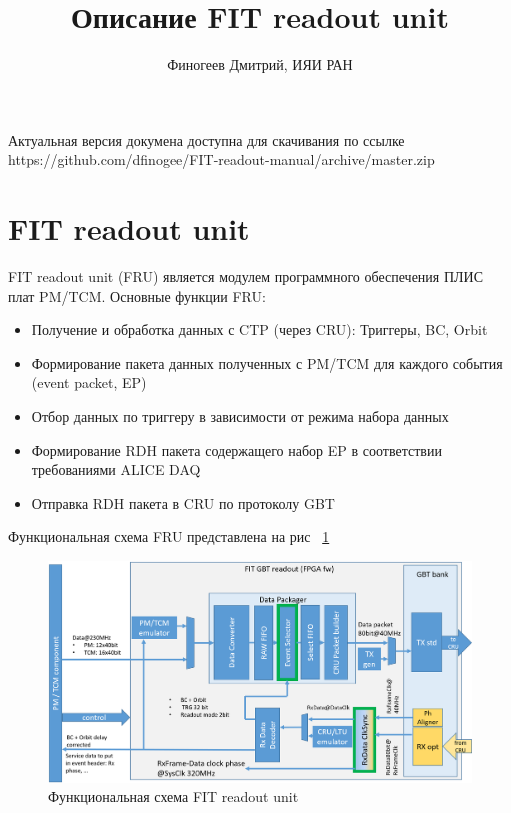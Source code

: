 \documentclass{article}
\title{Описание FIT readout unit}
\author{Финогеев Дмитрий, ИЯИ РАН}
\begin{document}
\maketitle

Актуальная версия докумена доступна для скачивания по ссылке
\newline
https://github.com/dfinogee/FIT-readout-manual/archive/master.zip



\tableofcontents
\newpage

\section{FIT readout unit}
FIT readout unit (FRU) является модулем программного обеспечения ПЛИС плат PM/TCM. Основные функции FRU:

\begin{itemize}
\item Получение и обработка данных с CTP (через CRU): Триггеры, BC, Orbit 
\item Формирование пакета данных полученных с PM/TCM для каждого события (event packet, EP)
\item Отбор данных по триггеру в зависимости от режима набора данных
\item Формирование RDH пакета содержащего набор EP в соответствии требованиями ALICE DAQ 
\item Отправка RDH пакета в CRU по протоколу GBT
\end{itemize}


Функциональная схема FRU представлена на рис ~\ref{fig:2}
\begin{figure}[H]
	\centering 
	\includegraphics[width=1\textwidth]{FIT_readout.png}
	\caption{\label{fig:2} Функциональная схема FIT readout unit}
\end{figure}
\end{document}
